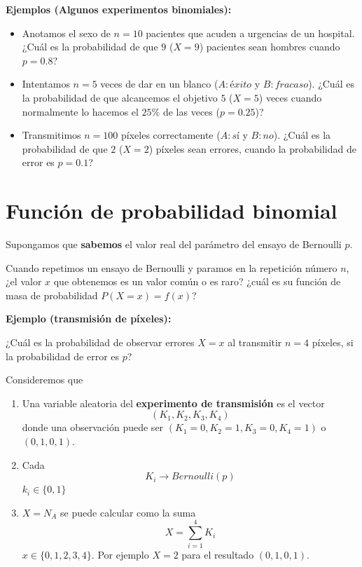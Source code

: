 \documentclass[
]{book}
\begin{document}
\textbf{Ejemplos (Algunos experimentos binomiales):}

\begin{itemize}
\item
  Anotamos el sexo de \(n=10\) pacientes que acuden a urgencias de un hospital. ¿Cuál es la probabilidad de que \(9\) (\(X=9\)) pacientes sean hombres cuando \(p=0.8\)?
\item
  Intentamos \(n=5\) veces de dar en un blanco (\(A:éxito\) y \(B:fracaso\)). ¿Cuál es la probabilidad de que alcancemos el objetivo \(5\) (\(X=5\)) veces cuando normalmente lo hacemos el \(25\%\) de las veces (\(p=0.25\))?
\item
  Transmitimos \(n=100\) píxeles correctamente (\(A:sí\) y \(B:no\)). ¿Cuál es la probabilidad de que \(2\) (\(X=2\)) píxeles sean errores, cuando la probabilidad de error es \(p=0.1\)?
\end{itemize}

\hypertarget{funciuxf3n-de-probabilidad-binomial}{%
\section{Función de probabilidad binomial}\label{funciuxf3n-de-probabilidad-binomial}}

Supongamos que \textbf{sabemos} el valor real del parámetro del ensayo de Bernoulli \(p\).

Cuando repetimos un ensayo de Bernoulli y paramos en la repetición número \(n\), ¿el valor \(x\) que obtenemos es un valor común o es raro? ¿cuál es su función de masa de probabilidad \(P(X=x)=f(x)\)?

\textbf{Ejemplo (transmisión de píxeles):}

¿Cuál es la probabilidad de observar errores \(X=x\) al transmitir \(n=4\) píxeles, si la probabilidad de error es \(p\)?

Consideremos que

\begin{enumerate}
\def\labelenumi{\arabic{enumi})}
\item
  Una variable aleatoria del \textbf{experimento de transmisión} es el vector \[(K_1, K_2, K_3, K_4)\] donde una observación puede ser \((K_1=0, K_2=1, K_3=0, K_4= 1)\) o \((0, 1, 0, 1)\).
\item
  Cada \[K_i \rightarrow Bernoulli(p)\] \(k_i \in \{0, 1\}\)
\item
  \(X=N_A\) se puede calcular como la suma \[X=\sum_{i=1}^4 K_i\] \(x\in \{0,1,2,3,4\}\). Por ejemplo \(X=2\) para el resultado \((0, 1, 0, 1)\).
\end{enumerate}
\end{document}
